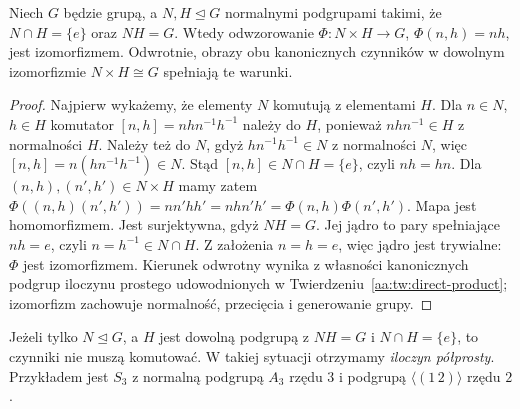 \begin{twierdzenie}
\label{aa:tw:internal-direct}
Niech $G$ będzie grupą, a $N,H\trianglelefteq G$
normalnymi podgrupami takimi, że $N\cap H=\{e\}$
oraz $NH=G$. Wtedy odwzorowanie
$\Phi:N\times H\to G$, $\Phi(n,h)=nh$, jest izomorfizmem.
Odwrotnie, obrazy obu kanonicznych czynników w dowolnym
izomorfizmie $N\times H\cong G$ spełniają te warunki.
\end{twierdzenie}
\begin{proof}
Najpierw wykażemy, że elementy $N$ komutują z elementami $H$.
Dla $n\in N$, $h\in H$ komutator
$[n,h]=nhn^{-1}h^{-1}$ należy do $H$, ponieważ
$nhn^{-1}\in H$ z normalności $H$.
Należy też do $N$, gdyż $hn^{-1}h^{-1}\in N$ z normalności $N$,
więc $[n,h]=n(hn^{-1}h^{-1})\in N$.
Stąd $[n,h]\in N\cap H=\{e\}$, czyli $nh=hn$.
Dla $(n,h),(n',h')\in N\times H$ mamy zatem
$\Phi((n,h)(n',h'))=nn'hh'=nhn'h'=
\Phi(n,h)\Phi(n',h')$. Mapa jest homomorfizmem.
Jest surjektywna, gdyż $NH=G$.
Jej jądro to pary spełniające $nh=e$, czyli $n=h^{-1}\in N\cap H$.
Z założenia $n=h=e$, więc jądro jest trywialne:
$\Phi$ jest izomorfizmem.
Kierunek odwrotny wynika z własności kanonicznych podgrup
iloczynu prostego udowodnionych w Twierdzeniu~\ref{aa:tw:direct-product};
izomorfizm zachowuje normalność, przecięcia i generowanie grupy.
\end{proof}

\begin{uwaga}
Jeżeli tylko $N\trianglelefteq G$, a $H$ jest dowolną podgrupą
z $NH=G$ i $N\cap H=\{e\}$, to czynniki nie muszą komutować.
W takiej sytuacji otrzymamy \emph{iloczyn półprosty}.
Przykładem jest $S_3$ z normalną podgrupą $A_3$ rzędu $3$
i podgrupą $\langle(1\,2)\rangle$ rzędu $2$.
\end{uwaga}

